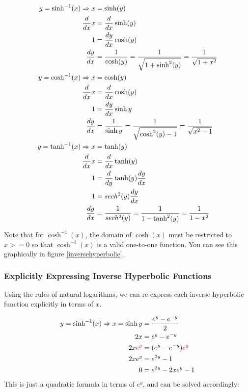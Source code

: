 \documentclass[12pt]{article}
\begin{document}
\begin{equation}
    \begin{split}
        y = \sinh^{-1}(x) \Rightarrow x &= \sinh (y)\\
        \frac{d}{dx} x &= \frac{d}{dx} \sinh(y) \\
        1 &= \frac{dy}{dx} \cosh(y)\\
        \frac{dy}{dx} &= \frac{1}{\cosh(y)} = \frac{1}{\sqrt{1 + \sinh^2(y)}} = \frac{1}{\sqrt{1+x^2}}\\
        y = \cosh^{-1}(x) \Rightarrow x &= \cosh(y)\\
        \frac{d}{dx} x &= \frac{d}{dx} \cosh(y)\\
        1 &= \frac{dy}{dx} \sinh y\\
        \frac{dy}{dx} &= \frac{1}{\sinh y} = \frac{1}{\sqrt{\cosh^2(y)-1}} = \frac{1}{\sqrt{x^2-1}}\\
        y = \tanh^{-1}(x) \Rightarrow x &= \tanh(y)\\
        \frac{d}{dx} x &= \frac{d}{dx} \tanh(y)\\
        1 &= \frac{d}{dy} \tanh(y) \frac{dy}{dx}\\
        1 &= sech^2(y) \frac{dy}{dx}\\
        \frac{dy}{dx} &= \frac{1}{sech^2(y)} = \frac{1}{1-\tanh^2(y)} = \frac{1}{1-x^2}
    \end{split}
\end{equation}

Note that for $\cosh^{-1}(x)$, the domain of $\cosh(x)$ must be restricted to $x>=0$ so that $\cosh^{-1}(x)$ is a valid one-to-one function. You can see this graphically in figure \ref{inversehyperbolic}.

\subsubsection{Explicitly Expressing Inverse Hyperbolic Functions}

Using the rules of natural logarithms, we can re-express each inverse hyperbolic function explicitly in terms of $x$.

\begin{equation}
    \begin{split}
        y=\sinh^{-1}(x) \Rightarrow x = \sinh y &= \frac{e^y-e^{-y}}{2}\\
        2x &= e^y-e^{-y}\\
        2x\textcolor{red}{e^y} &= (e^y-e^{-y})\textcolor{red}{e^y}\\
        2xe^y &= e^{2y} - 1\\
        0 &= e^{2y} - 2xe^y -1\\
    \end{split}
\end{equation}
This is just a quadratic formula in terms of $e^y$, and can be solved accordingly:
\end{document}
